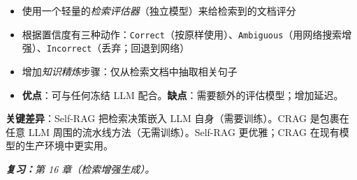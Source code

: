 \begin{questionbox}
\begin{itemize}
  \item 使用一个轻量的\emph{检索评估器}（独立模型）来给检索到的文档评分
  \item 根据置信度有三种动作：\texttt{Correct}（按原样使用）、\texttt{Ambiguous}（用网络搜索增强）、\texttt{Incorrect}（丢弃；回退到网络）
  \item 增加\emph{知识精炼}步骤：仅从检索文档中抽取相关句子
  \item \textbf{优点}：可与任何冻结 LLM 配合。\textbf{缺点}：需要额外的评估模型；增加延迟。
\end{itemize}

\textbf{关键差异}：Self-RAG 把检索决策嵌入 LLM 自身（需要训练）。CRAG 是包裹在任意 LLM 周围的流水线方法（无需训练）。Self-RAG 更优雅；CRAG 在现有模型的生产环境中更实用。

\emph{\textbf{复习：}第 16 章（检索增强生成）。}
\end{questionbox}

